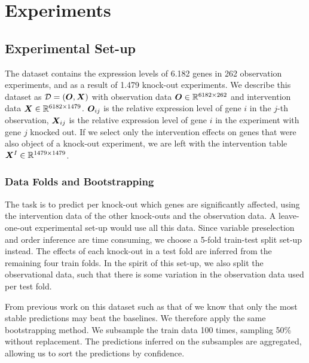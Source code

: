 \newpage
\section{Experiments}


\subsection{Experimental Set-up}

The \citet{kemmeren2014large} dataset contains the expression levels of 6.182 genes in 262 observation experiments, and as a result of 1.479 knock-out experiments. We describe this dataset as $\mathcal{D}=(\bm{O}, \bm{X})$ with observation data $\bm{O} \in \mathbb{R}^{6182\times 262}$ and intervention data $\bm{X} \in \mathbb{R}^{6182\times 1479}$. $\bm{O}_{ij}$ is the relative expression level of gene $i$ in the $j$-th observation, $\bm{X}_{ij}$ is the relative expression level of gene $i$ in the experiment with gene $j$ knocked out. If we select only the intervention effects on genes that were also object of a knock-out experiment, we are left with the intervention table $\bm{X}^I \in \mathbb{R}^{1479\times 1479}$.

\subsubsection{Data Folds and Bootstrapping}

The task is to predict per knock-out which genes are significantly affected, using the intervention data of the other knock-outs and the observation data. A leave-one-out experimental set-up would use all this data. Since variable preselection and order inference are time consuming, we choose a 5-fold train-test split set-up instead. The effects of each knock-out in a test fold are inferred from the remaining four train folds. In the spirit of this set-up, we also split the observational data, such that there is some variation in the observation data used per test fold.

From previous work on this dataset such as that of \citet{versteeg2019boosting} we know that only the most stable predictions may beat the baselines. We therefore apply the same bootstrapping method. We subsample the train data 100 times,  sampling 50\% without replacement. The predictions inferred on the subsamples are aggregated, allowing us to sort the predictions by confidence. 

